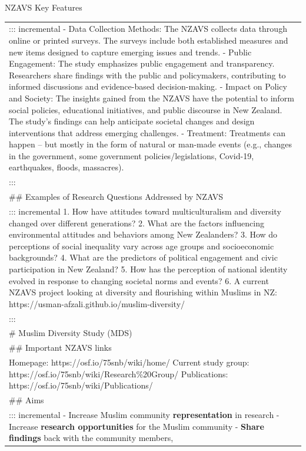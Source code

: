 \documentclass[
  ignorenonframetext,
  aspectratio=169,
]{beamer}
\begin{document}
\begin{frame}{NZAVS Key Features}
\begin{longtable}[]{@{}
  >{\raggedright\arraybackslash}p{}@{}}
\toprule\noalign{}
\endhead
::: incremental - Data Collection Methods: The NZAVS collects data
through online or printed surveys. The surveys include both established
measures and new items designed to capture emerging issues and trends. -
Public Engagement: The study emphasizes public engagement and
transparency. Researchers share findings with the public and
policymakers, contributing to informed discussions and evidence-based
decision-making. - Impact on Policy and Society: The insights gained
from the NZAVS have the potential to inform social policies, educational
initiatives, and public discourse in New Zealand. The study's findings
can help anticipate societal changes and design interventions that
address emerging challenges. - Treatment: Treatments can happen -- but
mostly in the form of natural or man-made events (e.g., changes in the
government, some government policies/legislations, Covid-19,
earthquakes, floods, massacres). \\
::: \\
\#\# Examples of Research Questions Addressed by NZAVS \\
::: incremental 1. How have attitudes toward multiculturalism and
diversity changed over different generations? 2. What are the factors
influencing environmental attitudes and behaviors among New Zealanders?
3. How do perceptions of social inequality vary across age groups and
socioeconomic backgrounds? 4. What are the predictors of political
engagement and civic participation in New Zealand? 5. How has the
perception of national identity evolved in response to changing societal
norms and events? 6. A current NZAVS project looking at diversity and
flourishing within Muslims in NZ:
https://usman-afzali.github.io/muslim-diversity/ \\
::: \\
\# Muslim Diversity Study (MDS) \\
\#\# Important NZAVS links \\
Homepage: https://osf.io/75snb/wiki/home/ Current study group:
https://osf.io/75snb/wiki/Research\%20Group/ Publications:
https://osf.io/75snb/wiki/Publications/ \\
\#\# Aims \\
::: incremental - Increase Muslim community \textbf{representation} in
research - Increase \textbf{research opportunities} for the Muslim
community - \textbf{Share findings} back with the community members,

\end{longtable}
\end{frame}
\end{document}
